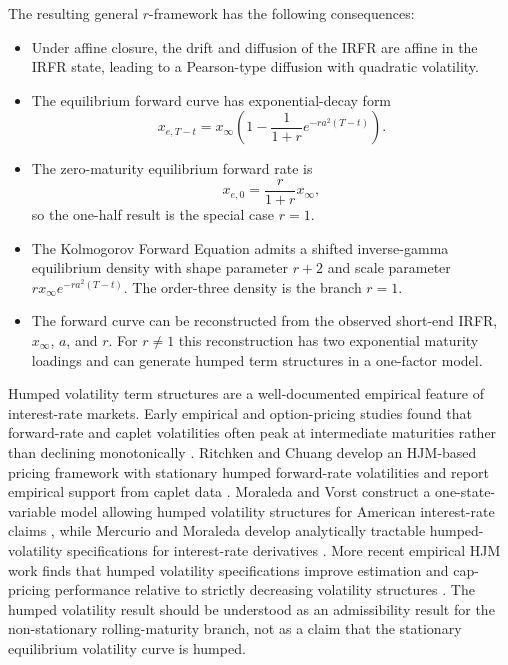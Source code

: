 \documentclass[12pt]{article}
\theoremstyle{statementstyle}
\begin{document}
The resulting general $r$-framework has the following consequences:

\begin{itemize}
\item Under affine closure, the drift and diffusion of the IRFR are affine
      in the IRFR state, leading to a Pearson-type diffusion with
      quadratic volatility.
\item The equilibrium forward curve has exponential-decay form
      \[
      x_{e,T-t}=x_{\infty}\left(1-\frac{1}{1+r}e^{-ra^{2}(T-t)}\right).
      \]
\item The zero-maturity equilibrium forward rate is
      \[
      x_{e,0}=\frac{r}{1+r}x_{\infty},
      \]
      so the one-half result is the special case $r=1$.
\item The Kolmogorov Forward Equation admits a shifted inverse-gamma
      equilibrium density with shape parameter $r+2$ and scale parameter
      $r x_{\infty}e^{-ra^{2}(T-t)}$. The order-three density is the
      branch $r=1$.
\item The forward curve can be reconstructed from the observed short-end
      IRFR, $x_{\infty}$, $a$, and $r$. For $r\neq 1$ this reconstruction
      has two exponential maturity loadings and can generate humped term
      structures in a one-factor model.
\end{itemize}

Humped volatility term structures are a well-documented empirical feature of
interest-rate markets. Early empirical and option-pricing studies found that
forward-rate and caplet volatilities often peak at intermediate maturities
rather than declining monotonically \cite{RitchkenChuang1999,
MercurioMoraleda2000}. Ritchken and Chuang develop an HJM-based pricing
framework with stationary humped forward-rate volatilities and report empirical
support from caplet data \cite{RitchkenChuang1999}. Moraleda and Vorst construct
a one-state-variable model allowing humped volatility structures for American
interest-rate claims \cite{MoraledaVorst1997}, while Mercurio and Moraleda
develop analytically tractable humped-volatility specifications for
interest-rate derivatives \cite{MercurioMoraleda2000,MercurioMoraleda2001}.
More recent empirical HJM work finds that humped volatility specifications
improve estimation and cap-pricing performance relative to strictly decreasing
volatility structures \cite{Falini2010}. The humped volatility result should be understood as an admissibility result for the non-stationary rolling-maturity branch, not as a claim that the stationary equilibrium volatility curve is humped.
\end{document}
